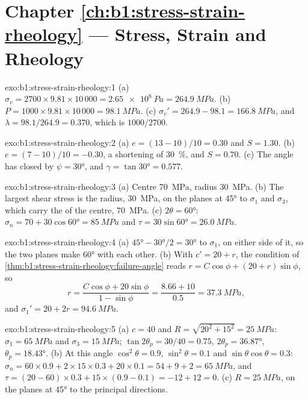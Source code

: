\section*{Chapter \ref{ch:b1:stress-strain-rheology} --- Stress, Strain and Rheology}

\begin{solution}{exo:b1:stress-strain-rheology:1}
(a) $\sigma_v = 2700\times9.81\times10\,000 = \qty{2.65e8}{Pa} = \qty{264.9}{MPa}$.
(b) $P = 1000\times9.81\times10\,000 = \qty{98.1}{MPa}$. (c) $\sigma_v' =
264.9 - 98.1 = \qty{166.8}{MPa}$, and $\lambda = 98.1/264.9 = 0.370$, which is
$1000/2700$.
\end{solution}

\begin{solution}{exo:b1:stress-strain-rheology:2}
(a) $e = (13-10)/10 = 0.30$ and $S = 1.30$. (b) $e = (7-10)/10 = -0.30$, a
shortening of \qty{30}{\percent}, and $S = 0.70$. (c) The angle has closed by
$\psi = \ang{30}$, and $\gamma = \tan\ang{30} = 0.577$.
\end{solution}

\begin{solution}{exo:b1:stress-strain-rheology:3}
(a) Centre \qty{70}{MPa}, radius \qty{30}{MPa}. (b) The largest shear stress
is the radius, \qty{30}{MPa}, on the planes at \ang{45} to $\sigma_1$ and
$\sigma_3$, which carry the  of the centre, \qty{70}{MPa}. (c)
$2\theta = \ang{60}$: $\sigma_n = 70 + 30\cos\ang{60} = \qty{85}{MPa}$ and
$\tau = 30\sin\ang{60} = \qty{26.0}{MPa}$.
\end{solution}

\begin{solution}{exo:b1:stress-strain-rheology:4}
(a) $\ang{45} - \ang{30}/2 = \ang{30}$ to $\sigma_1$, on either side of it,
so the two planes make \ang{60} with each other. (b) With $c' = 20 + r$, the
condition of \cref{thm:b1:stress-strain-rheology:failure-angle} reads
$r = C\cos\phi + (20 + r)\sin\phi$, so
\[
  r = \frac{C\cos\phi + 20\sin\phi}{1 - \sin\phi} = \frac{8.66 + 10}{0.5}
    = \qty{37.3}{MPa},
\]
and $\sigma_1' = 20 + 2r = \qty{94.6}{MPa}$.
\end{solution}

\begin{solution}{exo:b1:stress-strain-rheology:5}
(a) $c = 40$ and $R = \sqrt{20^2 + 15^2} = \qty{25}{MPa}$: $\sigma_1 =
\qty{65}{MPa}$ and $\sigma_3 = \qty{15}{MPa}$; $\tan2\theta_p = 30/40 = 0.75$,
$2\theta_p = \ang{36.87}$, $\theta_p = \ang{18.43}$. (b) At this angle
$\cos^2\theta = 0.9$, $\sin^2\theta = 0.1$ and $\sin\theta\cos\theta = 0.3$:
$\sigma_n = 60\times0.9 + 2\times15\times0.3 + 20\times0.1 = 54 + 9 + 2 =
\qty{65}{MPa}$, and $\tau = (20-60)\times0.3 + 15\times(0.9-0.1) = -12 + 12 =
0$. (c) $R = \qty{25}{MPa}$, on the planes at \ang{45} to the principal
directions.
\end{solution}


